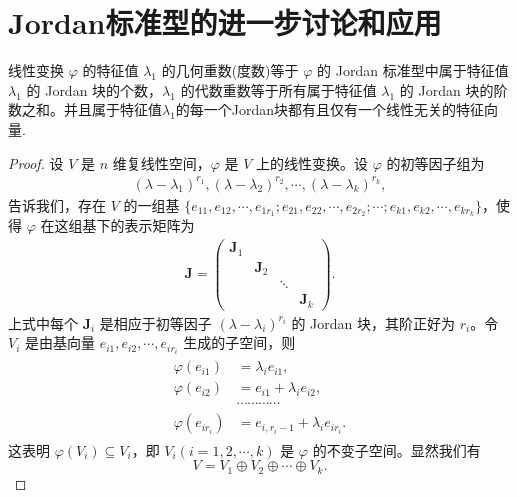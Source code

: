 \documentclass[../../main.tex]{subfiles}%
\begin{document}
\section{Jordan标准型的进一步讨论和应用}

\begin{theorem}\label{theorem:关于一个特征值的Jordan块的个数等于其度数,阶数直和等于其重数}
线性变换 $\varphi$ 的特征值 $\lambda_1$ 的几何重数(度数)等于 $\varphi$ 的 Jordan 标准型中属于特征值 $\lambda_1$ 的 Jordan 块的个数，$\lambda_1$ 的代数重数等于所有属于特征值 $\lambda_1$ 的 Jordan 块的阶数之和。并且属于特征值$\lambda_1$的每一个Jordan块都有且仅有一个线性无关的特征向量.
\end{theorem}
\begin{proof}
设 $V$ 是 $n$ 维复线性空间，$\varphi$ 是 $V$ 上的线性变换。设 $\varphi$ 的初等因子组为
\begin{align}
(\lambda - \lambda_1)^{r_1}, (\lambda - \lambda_2)^{r_2}, \cdots, (\lambda - \lambda_k)^{r_k}, \label{equation--7.7.1}
\end{align}
告诉我们，存在 $V$ 的一组基 $\{e_{11}, e_{12}, \cdots, e_{1r_1}; e_{21}, e_{22}, \cdots, e_{2r_2}; \cdots; e_{k1}, e_{k2}, \cdots, e_{kr_k}\}$，使得 $\varphi$ 在这组基下的表示矩阵为
\begin{align*}
\boldsymbol{J} = 
\begin{pmatrix}
\boldsymbol{J}_1 & & & \\
& \boldsymbol{J}_2 & & \\
& & \ddots & \\
& & & \boldsymbol{J}_k
\end{pmatrix}.
\end{align*}
上式中每个 $\boldsymbol{J}_i$ 是相应于初等因子 $(\lambda - \lambda_i)^{r_i}$ 的 Jordan 块，其阶正好为 $r_i$。令 $V_i$ 是由基向量 $e_{i1}, e_{i2}, \cdots, e_{ir_i}$ 生成的子空间，则
\begin{gather}\label{equation--7.7.2}
\begin{aligned}
\varphi(e_{i1}) &= \lambda_i e_{i1}, 
 \\
\varphi(e_{i2}) &= e_{i1} + \lambda_i e_{i2},  \\
&\cdots\cdots\cdots\cdots \\
\varphi(e_{ir_i}) &= e_{i,r_i - 1} + \lambda_i e_{ir_i}.
\end{aligned}
\end{gather}
这表明 $\varphi(V_i) \subseteq V_i$，即 $V_i (i = 1, 2, \cdots, k)$ 是 $\varphi$ 的不变子空间。显然我们有
\[
V = V_1 \oplus V_2 \oplus \cdots \oplus V_k.
\]


\end{proof}
\end{document}
